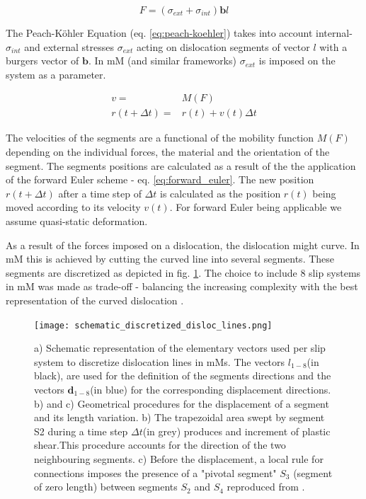 \begin{equation}
	F = (\sigma_{ext}+\sigma_{int}) \mathbf{b}l  \label{eq:peach-koehler}
\end{equation}

The Peach-Köhler Equation (eq. \ref{eq:peach-koehler}) takes into account internal- \( \sigma_{int} \) and external stresses  \( \sigma_{ext} \) acting on dislocation segments of vector \(l\) with a burgers vector of \( \mathbf{b}\). In mM (and similar frameworks) \( \sigma_{ext}\) is imposed on the system as a parameter. 

\begin{subequations}
	\begin{align}
		v =& M(F) \label{eq:vleocities_mobility_func} \\
		r(t+\Delta t) =& r(t) + v(t)\Delta t \label{eq:forward_euler}
	\end{align}
\end{subequations}

The velocities of the segments are a functional of the mobility function \(M(F)\) depending on the individual forces, the material and the orientation of the segment. The segments positions are calculated as a result of the the application of the forward Euler scheme - eq. \ref{eq:forward_euler}. The new position \( r(t+ \Delta t)\) after a time step of \(\Delta t\) is calculated as the position \(r(t)\) being moved according to its velocity \(v(t)\). For forward Euler being applicable we assume quasi-static deformation. 

As a result of the forces imposed on a dislocation, the dislocation might curve. In mM this is achieved by cutting the curved line into several segments. These segments are discretized as depicted in fig. \ref{fig:schematic_segments_dislocs}. The choice to include 8 slip systems in mM was made as trade-off - balancing the increasing complexity with the best representation of the curved dislocation \cite{devincre2011}.

\begin{figure}[htb]
	\centering
	\texttt{[image: schematic\_discretized\_disloc\_lines.png]}
	\label{fig:schematic_segments_dislocs}
	\caption{a) Schematic representation of the elementary vectors used per slip system to discretize dislocation lines in mMs. The vectors \(l_{1-8}\)(in black), are used for the deﬁnition of the segments directions and the vectors \(\mathbf{d}_{1-8}\)(in blue) for the corresponding displacement directions. b) and c) Geometrical procedures for the displacement of a segment and its length variation. b) The trapezoidal area swept by segment S2 during a time step \(\Delta t\)(in grey) produces and increment of plastic shear.This procedure accounts for the direction of the two neighbouring segments. c) Before the displacement, a local rule for connections imposes the presence of a "pivotal segment" \(S_{3}\) (segment of zero length) between segments \(S_{2}\) and \(S_{4}\) reproduced from \cite{devincre2011}.}
\end{figure}

